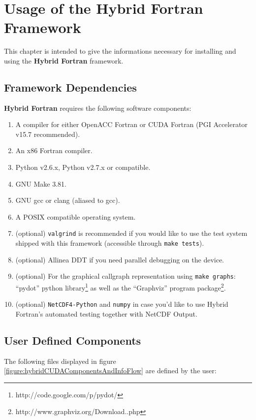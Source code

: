 \chapter{Usage of the Hybrid Fortran Framework} \label{cha:usage}

This chapter is intended to give the informations necessary for installing and using the \textbf{Hybrid Fortran} framework.

\section{Framework Dependencies} \label{sec:dependencies}

\textbf{Hybrid Fortran} requires the following software components:

\begin{enumerate}
 \item A compiler for either OpenACC Fortran or CUDA Fortran (PGI Accelerator v15.7 recommended).
 \item An x86 Fortran compiler.
 \item Python v2.6.x, Python v2.7.x or compatible.
 \item GNU Make 3.81.
 \item GNU gcc or clang (aliased to gcc).
 \item A POSIX compatible operating system.
 \item (optional) \verb|valgrind| is recommended if you would like to use the test system shipped with this framework (accessible through \verb|make tests|).
 \item (optional) Allinea DDT if you need parallel debugging on the device.
 \item (optional) For the graphical callgraph representation using \verb|make graphs|: ``pydot'' python library\footnote{http://code.google.com/p/pydot/} as well as the ``Graphviz'' program package\footnote{http://www.graphviz.org/Download..php}.
 \item (optional) \verb|NetCDF4-Python| and \verb|numpy| in case you'd like to use Hybrid Fortran's automated testing together with NetCDF Output.
\end{enumerate}

\section{User Defined Components} \label{sub:userDefined}

The following files displayed in figure \ref{figure:hybridCUDAComponentsAndInfoFlow} are defined by the user:

